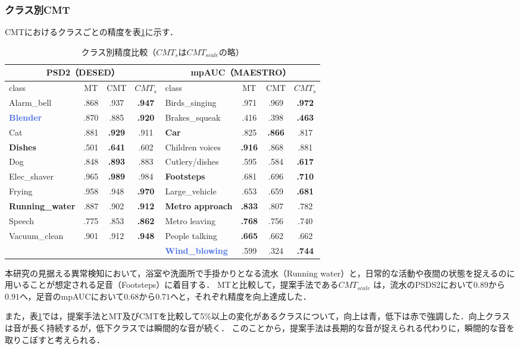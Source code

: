\documentclass[main]{subfiles}
\begin{document}
\subsubsection{クラス別CMT}
\label{classwise}
CMTにおけるクラスごとの精度を表\ref{table:classWise}に示す．
\begin{table}[H]
  \centering
  \footnotesize
  \setlength{\tabcolsep}{3pt}
  \begin{tabular}{|l|c|c|c||l|c|c|c|}
    \hline
    \multicolumn{4}{|c||}{PSD2（DESED）} & \multicolumn{4}{c|}{mpAUC（MAESTRO）} \\
    \hline
    class & MT & CMT & $CMT_{s}$ & class & MT & CMT & $CMT_{s}$ \\
    \hline
    Alarm\_bell & .868 & .937 & \textbf{.947} & Birds\_singing & .971 & .969 & \textbf{.972} \\
    \textcolor{RoyalBlue}{\textbf{Blender}} & .870 & .885 & \textbf{.920} & Brakes\_squeak & .416 & .398 & \textbf{.463} \\
    Cat & .881 & \textbf{.929} & .911 & \textcolor{BrickRed}{\textbf{Car}} & .825 & \textbf{.866} & .817 \\
    \textcolor{BrickRed}{\textbf{Dishes}} & .501 & \textbf{.641} & .602 & Children voices & \textbf{.916} & .868 & .881 \\
    Dog & .848 & \textbf{.893} & .883 & Cutlery/dishes & .595 & .584 & \textbf{.617} \\
    Elec\_shaver & .965 & \textbf{.989} & .984 & \textbf{Footsteps} & .681 & .696 & \textbf{.710} \\
    Frying & .958 & .948 & \textbf{.970} & Large\_vehicle & .653 & .659 & \textbf{.681} \\
    \textbf{Running\_water} & .887 & .902 & \textbf{.912} & \textcolor{BrickRed}{\textbf{Metro approach}} & \textbf{.833} & .807 & .782 \\
    Speech & .775 & .853 & \textbf{.862} & Metro leaving & \textbf{.768} & .756 & .740 \\
    Vacuum\_clean & .901 & .912 & \textbf{.948} & People talking & \textbf{.665} & .662 & .662 \\
    & & & & \textcolor{RoyalBlue}{\textbf{Wind\_blowing}} & .599 & .324 & \textbf{.744} \\
    \hline
  \end{tabular}
  \caption{クラス別精度比較（$CMT_{s}$は$CMT_{scale}$の略）}
  \label{table:classWise}
\end{table}
本研究の見据える異常検知において，浴室や洗面所で手掛かりとなる流水（Running water）と，日常的な活動や夜間の状態を捉えるのに用いることが想定される足音（Footsteps）に着目する．
MTと比較して，提案手法である$CMT_{scale}$ は，流水のPSDS2において$0.89$から$0.91$へ，足音のmpAUCにおいて$0.68$から$0.71$へと，それぞれ精度を向上達成した．\par
また，表\ref{table:classWise}では，提案手法とMT及びCMTを比較して{5\%}以上の変化があるクラスについて，向上は青，低下は赤で強調した．向上クラスは音が長く持続するが，低下クラスでは瞬間的な音が続く．
このことから，提案手法は長期的な音が捉えられる代わりに，瞬間的な音を取りこぼすと考えられる．
\end{document}
